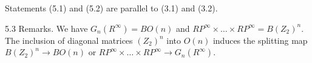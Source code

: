 Statements (5.1) and (5.2) are parallel to (3.1) and (3.2).

5.3 Remarks. We have $G_n(R^\infty) = BO(n)$ and $RP^\infty \times \dots \times RP^\infty = B(Z_2)^n$. The inclusion of diagonal matrices $(Z_2)^n$ into $O(n)$ induces the splitting map $B(Z_2)^n \rightarrow BO(n)$ or $RP^\infty \times \dots \times RP^\infty \rightarrow G_n(R^\infty)$.
